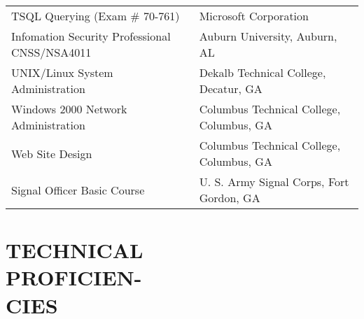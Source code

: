 \documentclass[margin, 10pt]{res} %
\begin{document}
\begin{resume}
\small
    \begin{tabular}{l l }
        TSQL Querying (Exam \# 70-761) & Microsoft Corporation\\
        Infomation Security Professional CNSS/NSA4011  & Auburn University, Auburn, AL\\
        UNIX/Linux System Administration  & Dekalb Technical College,  Decatur, GA\\
        Windows 2000 Network Administration  & Columbus Technical College, Columbus, GA\\
        Web Site Design  & Columbus Technical College, Columbus, GA\\
        Signal Officer Basic Course  & U. S. Army Signal Corps,  Fort Gordon, GA\\
    \end{tabular}
    \normalsize
%
%
%
%
%
%


\section{TECHNICAL\\ PROFICIEN-\\ CIES}

\begin{itemize} \itemsep -2pt %


\end{itemize}
\end{resume}
\end{document}
